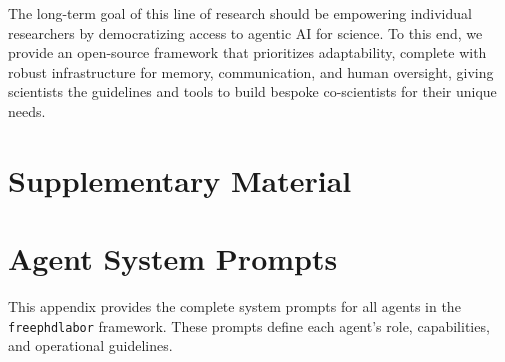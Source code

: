 \documentclass{article}
\begin{document}
The long-term goal of this line of research should be empowering individual researchers by democratizing access to agentic AI for science. To this end, we provide an open-source framework that prioritizes adaptability, complete with robust infrastructure for memory, communication, and human oversight, giving scientists the guidelines and tools to build bespoke co-scientists for their unique needs.




\newpage




\newpage
\appendix
\onecolumn

\section*{\LARGE Supplementary Material}
\label{sec:appendix}

\section{Agent System Prompts}
\label{sec:agent_prompts}

This appendix provides the complete system prompts for all agents in the \texttt{freephdlabor} framework. These prompts define each agent's role, capabilities, and operational guidelines.
\end{document}
